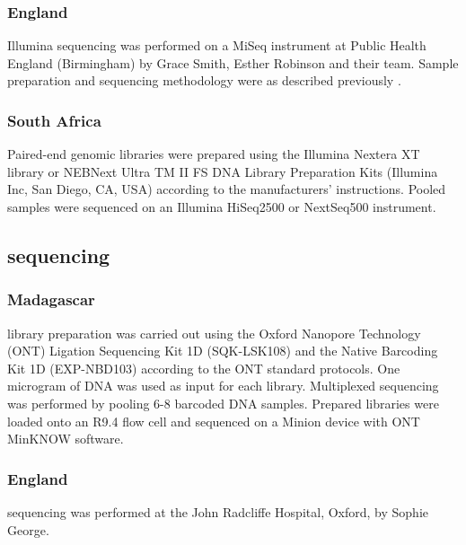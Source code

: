 \subsubsection{England}

Illumina sequencing was performed on a MiSeq instrument at Public Health England (Birmingham) by Grace Smith, Esther Robinson and their team. Sample preparation and sequencing methodology were as described previously \cite{Votintseva2015}.

\subsubsection{South Africa}
Paired-end genomic libraries were prepared using the Illumina Nextera XT library or NEBNext Ultra TM II FS DNA Library Preparation Kits (Illumina Inc, San Diego, CA, USA) according to the manufacturers’ instructions. Pooled samples were sequenced on an Illumina HiSeq2500 or NextSeq500 instrument.

\subsection{\ont{} sequencing}

\subsubsection{Madagascar}
\ont{} library preparation was carried out using the Oxford Nanopore Technology (ONT) Ligation Sequencing Kit 1D (SQK-LSK108) and the Native Barcoding Kit 1D (EXP-NBD103) according to the ONT standard protocols. One microgram of DNA was used as input for each library. Multiplexed sequencing was performed by pooling 6-8 barcoded DNA samples. Prepared libraries were loaded onto an R9.4 flow cell and sequenced on a Minion device with ONT MinKNOW software.

\subsubsection{England}

\ont{} sequencing was performed at the John Radcliffe Hospital, Oxford, by Sophie George. 


